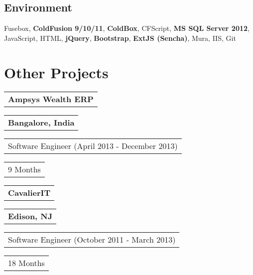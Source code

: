 \documentclass[letterpaper,11pt]{article}
\begin{document}
    \subsection{Environment}
    Fusebox, \textbf{\color{darkgray}ColdFusion 9/10/11}, \textbf{\color{darkgray}ColdBox}, CFScript, \textbf{\color{darkgray}MS SQL Server 2012}, JavaScript, HTML, \textbf{\color{darkgray}jQuery}, \textbf{\color{darkgray}Bootstrap}, \textbf{\color{darkgray}ExtJS (Sencha)}, Mura, IIS, Git


    \section{Other Projects}


    \begin{tabular}[t]{@{}l}
    \textbf{\color{darkgray}Ampsys Wealth ERP}
    \end{tabular}
    \hfill
    \begin{tabular}[t]{l@{}}
    \textbf{\color{darkgray}Bangalore, India}
    \end{tabular}
    \noindent\newline
    \begin{tabular}[t]{@{}l}
    Software Engineer (April 2013 - December 2013)
    \end{tabular}
    \hfill
    \begin{tabular}[t]{l@{}}
    9 Months
    \end{tabular}


    \vspace{0.25cm}
    \noindent
    \begin{tabular}[t]{@{}l}
    \textbf{\color{darkgray}CavalierIT}
    \end{tabular}
    \hfill
    \begin{tabular}[t]{l@{}}
    \textbf{\color{darkgray}Edison, NJ}
    \end{tabular}
    \noindent\newline
    \begin{tabular}[t]{@{}l}
    Software Engineer (October 2011 - March 2013)
    \end{tabular}
    \hfill
    \begin{tabular}[t]{l@{}}
    18 Months
    \end{tabular}
\end{document}
